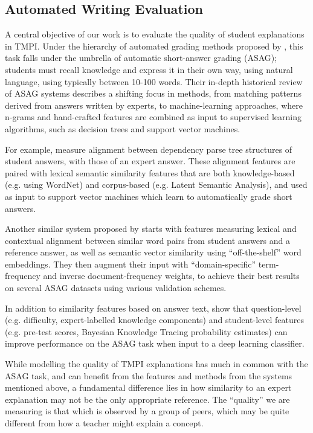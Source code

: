 \documentclass[notitlepage,12pt]{jedm}
\begin{document}
\subsection{Automated Writing Evaluation}

A central objective of our work is to evaluate the quality of student 
explanations in TMPI.
Under the hierarchy of automated grading methods proposed by  
\cite{burrows_eras_2015}, this task falls under the umbrella of automatic 
short-answer grading (ASAG); students must recall knowledge and express it 
in their own way, using natural language, using typically between 10-100 words. 
Their in-depth historical review of ASAG systems describes a shifting focus in 
methods, from matching patterns derived from answers written by experts, to 
machine-learning approaches, where n-grams and hand-crafted features are 
combined as input to supervised learning algorithms, such as decision trees and 
support vector machines.

For example, \cite{mohler_learning_2011} measure alignment between dependency 
parse tree structures of student answers, with those of an expert answer.
These alignment features are paired with lexical semantic similarity features 
that are both knowledge-based (e.g. using WordNet) and corpus-based (e.g. 
Latent Semantic Analysis), and used as input to support vector machines which 
learn to automatically grade short answers.

Another similar system proposed by \cite{sultan_fast_2016} starts with features 
measuring lexical and contextual alignment between similar word pairs from 
student answers and a reference answer, as well as semantic vector similarity 
using ``off-the-shelf'' word embeddings.  
They then augment their input with  ``domain-specific'' term-frequency and 
inverse document-frequency weights, to achieve their best results on several 
ASAG datasets using various validation schemes.
 
In addition to similarity features based on answer text, \cite{zhang_deep_2016} 
show that question-level (e.g. difficulty, expert-labelled knowledge 
components) and student-level features (e.g. pre-test scores, Bayesian 
Knowledge Tracing probability estimates) can improve performance on the ASAG 
task when input to a deep learning classifier.

While modelling the quality of TMPI explanations has much in common with the 
ASAG task, and can benefit from the features and methods from the systems 
mentioned above, a fundamental difference lies in how similarity to an expert 
explanation may not be the only appropriate reference.
The ``quality'' we are measuring is that which is observed by a group of peers, 
which may be quite different from how a teacher might explain a concept.
\end{document}

